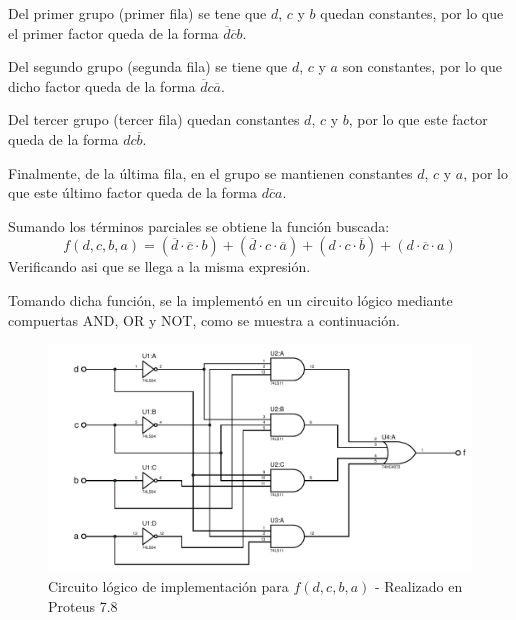 \begin{centering}
    \begin{Karnaugh}
    \end{Karnaugh}
\par\end{centering}

Del primer grupo (primer fila) se tene que $d$, $c$ y $b$ quedan
constantes, por lo que el primer factor queda de la forma
$ \overline{d} \overline{c} b$.\par
Del segundo grupo (segunda fila) se tiene que $d$, $c$ y $a$ son
constantes, por lo que dicho factor queda de la forma $ \overline{d} c \overline{a}$.\par
Del tercer grupo (tercer fila) quedan constantes $d$, $c$ y $b$, por lo
que este factor queda de la forma $d c \overline{b}$.\par
Finalmente, de la última fila, en el grupo se mantienen constantes
$d$, $c$ y $a$, por lo que este último factor queda de la forma
$d \overline{c} a$.\par
Sumando los términos parciales se obtiene la función buscada:
\[
    \boxed{f(d,c,b,a)=(\overline{d} \cdot \overline{c} \cdot b)+
    (\overline{d} \cdot c \cdot \overline{a})+
    (d \cdot c \cdot \overline{b})+
    (d \cdot \overline{c} \cdot a)}
\]
Verificando asi que se llega a la misma expresión.\par
Tomando dicha función, se la implementó en un circuito lógico mediante
compuertas AND, OR y NOT, como se muestra a continuación.

\begin{figure}[H]
    \begin{centering}
    \includegraphics[width=1\textwidth]{ImplementacionEj2}
    \par\end{centering}
    \caption{Circuito lógico de implementación para $f(d,c,b,a)$ - Realizado en Proteus 7.8}
\end{figure}

